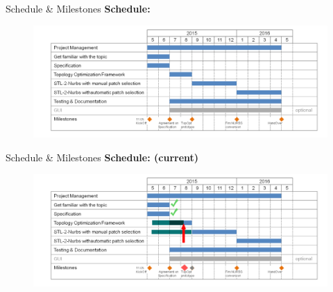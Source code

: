 \begin{frame}{Schedule \& Milestones}
\textbf{Schedule:}
\begin{figure}
\includegraphics[width=1.0\linewidth]{Pictures/Schedule/schedule.png}
\end{figure}
\end{frame}

\begin{frame}{Schedule \& Milestones}
\textbf{Schedule: (current)}
\begin{figure}
\includegraphics[width=1.0\linewidth]{Pictures/Schedule/schedule_new.png}
\end{figure}
\end{frame}